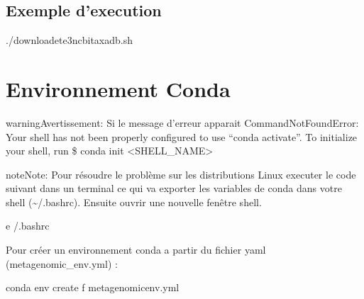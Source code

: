 \documentclass[letterpaper,10pt,french]{sphinxmanual}
\begin{document}
\subsection{Exemple d’execution}
\label{\detokenize{download/download_ete3_ncbi_taxonomy_database.sh:exemple-d-execution}}
\begin{sphinxVerbatim}[commandchars=\\\{\}]
./download\PYGZus{}ete3\PYGZus{}ncbi\PYGZus{}taxa\PYGZus{}db.sh
\end{sphinxVerbatim}


\section{Environnement Conda}
\label{\detokenize{conda/conda_environnement:environnement-conda}}\label{\detokenize{conda/conda_environnement::doc}}
\begin{sphinxadmonition}{warning}{Avertissement:}
Si le message d’erreur apparait CommandNotFoundError: Your shell has not been properly configured to use “conda activate”.
To initialize your shell, run
\$ conda init \textless{}SHELL\_NAME\textgreater{}
\end{sphinxadmonition}

\begin{sphinxadmonition}{note}{Note:}
Pour résoudre le problème sur les distributions Linux executer le code suivant dans un terminal ce qui va exporter les variables de conda dans votre shell (\textasciitilde{}/.bashrc). Ensuite ouvrir une nouvelle fenêtre shell.
\end{sphinxadmonition}

\begin{sphinxVerbatim}[commandchars=\\\{\}]
 \PYGZhy{}e  \PYGZgt{}\PYGZgt{} \PYGZti{}/.bashrc
\end{sphinxVerbatim}

Pour créer un environnement conda a partir du fichier yaml (metagenomic\_env.yml) :

\begin{sphinxVerbatim}[commandchars=\\\{\}]
conda env create \PYGZhy{}f metagenomic\PYGZus{}env.yml
\end{sphinxVerbatim}
\end{document}
